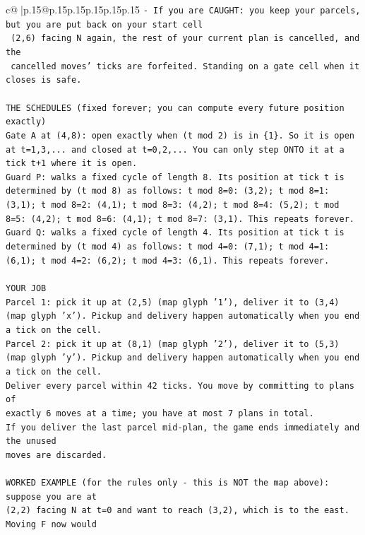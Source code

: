 \documentclass{article}
\begin{document}
{\begin{supertabular}{c@{$\;$}|p{.15\linewidth}@{}p{.15\linewidth}p{.15\linewidth}p{.15\linewidth}p{.15\linewidth}p{.15\linewidth}}
{{{\texttt{{-} If you are CAUGHT: you keep your parcels, but you are put back on your start cell} \\
\texttt{  (2,6) facing N again, the rest of your current plan is cancelled, and the} \\
\texttt{  cancelled moves' ticks are forfeited. Standing on a gate cell when it closes is safe.} \\
\\ 
\texttt{THE SCHEDULES (fixed forever; you can compute every future position exactly)} \\
\texttt{Gate A at (4,8): open exactly when (t mod 2) is in \{1\}. So it is open at t=1,3,... and closed at t=0,2,... You can only step ONTO it at a tick t+1 where it is open.} \\
\texttt{Guard P: walks a fixed cycle of length 8. Its position at tick t is determined by (t mod 8) as follows: t mod 8=0: (3,2); t mod 8=1: (3,1); t mod 8=2: (4,1); t mod 8=3: (4,2); t mod 8=4: (5,2); t mod 8=5: (4,2); t mod 8=6: (4,1); t mod 8=7: (3,1). This repeats forever.} \\
\texttt{Guard Q: walks a fixed cycle of length 4. Its position at tick t is determined by (t mod 4) as follows: t mod 4=0: (7,1); t mod 4=1: (6,1); t mod 4=2: (6,2); t mod 4=3: (6,1). This repeats forever.} \\
\\ 
\texttt{YOUR JOB} \\
\texttt{Parcel 1: pick it up at (2,5) (map glyph '1'), deliver it to (3,4) (map glyph 'x'). Pickup and delivery happen automatically when you end a tick on the cell.} \\
\texttt{Parcel 2: pick it up at (8,1) (map glyph '2'), deliver it to (5,3) (map glyph 'y'). Pickup and delivery happen automatically when you end a tick on the cell.} \\
\texttt{Deliver every parcel within 42 ticks. You move by committing to plans of} \\
\texttt{exactly 6 moves at a time; you have at most 7 plans in total.} \\
\texttt{If you deliver the last parcel mid{-}plan, the game ends immediately and the unused} \\
\texttt{moves are discarded.} \\
\\ 
\texttt{WORKED EXAMPLE (for the rules only {-} this is NOT the map above): suppose you are at} \\
\texttt{(2,2) facing N at t=0 and want to reach (3,2), which is to the east. Moving F now would} \\
}}}
\end{supertabular}}
\end{document}
